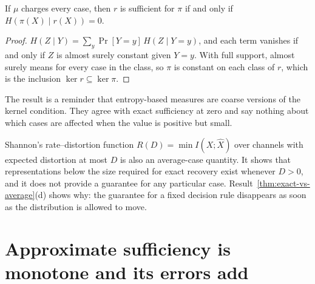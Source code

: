 \begin{newresult}\label{prop:entropy}
If $\mu$ charges every case, then $r$ is sufficient for $\pi$ if and only if $H(\pi(X)\mid r(X))=0$.
\end{newresult}
\begin{proof}
$H(Z\mid Y)=\sum_{y}\Pr[Y=y]\,H(Z\mid Y=y)$, and each term vanishes if and only if $Z$ is almost surely constant given $Y=y$. With full support, almost surely means for every case in the class, so $\pi$ is constant on each class of $r$, which is the inclusion $\ker r\subseteq\ker\pi$.
\end{proof}

The result is a reminder that entropy-based measures are coarse versions of the kernel condition. They agree with exact sufficiency at zero and say nothing about which cases are affected when the value is positive but small.

\begin{remark}
Shannon's rate--distortion function $R(D)=\min I(X;\hat X)$ over channels with expected distortion at most $D$ is also an average-case quantity. It shows that representations below the size required for exact recovery exist whenever $D>0$, and it does not provide a guarantee for any particular case. Result~\ref{thm:exact-vs-average}(d) shows why: the guarantee for a fixed decision rule disappears as soon as the distribution is allowed to move.
\end{remark}

\section{Approximate sufficiency is monotone and its errors add}

